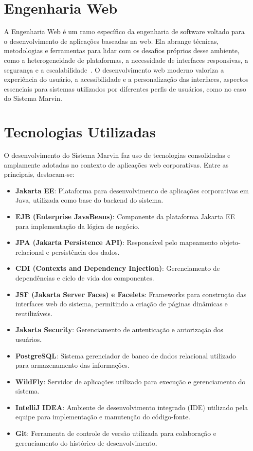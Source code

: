 \section{Engenharia Web}
\label{sec-fundteo-engweb}

A Engenharia Web é um ramo específico da engenharia de software voltado para o desenvolvimento de aplicações baseadas na web. Ela abrange técnicas, metodologias e ferramentas para lidar com os desafios próprios desse ambiente, como a heterogeneidade de plataformas, a necessidade de interfaces responsivas, a segurança e a escalabilidade~\cite{gellersen2002web}. O desenvolvimento web moderno valoriza a experiência do usuário, a acessibilidade e a personalização das interfaces, aspectos essenciais para sistemas utilizados por diferentes perfis de usuários, como no caso do Sistema Marvin.

\section{Tecnologias Utilizadas}
\label{sec-fundteo-tecnologias}

O desenvolvimento do Sistema Marvin faz uso de tecnologias consolidadas e amplamente adotadas no contexto de aplicações web corporativas. Entre as principais, destacam-se:

\begin{itemize}
    \item \textbf{Jakarta EE}: Plataforma para desenvolvimento de aplicações corporativas em Java, utilizada como base do backend do sistema.
    \item \textbf{EJB (Enterprise JavaBeans)}: Componente da plataforma Jakarta EE para implementação da lógica de negócio.
    \item \textbf{JPA (Jakarta Persistence API)}: Responsável pelo mapeamento objeto-relacional e persistência dos dados.
    \item \textbf{CDI (Contexts and Dependency Injection)}: Gerenciamento de dependências e ciclo de vida dos componentes.
    \item \textbf{JSF (Jakarta Server Faces) e Facelets}: Frameworks para construção das interfaces web do sistema, permitindo a criação de páginas dinâmicas e reutilizáveis.
    \item \textbf{Jakarta Security}: Gerenciamento de autenticação e autorização dos usuários.
    \item \textbf{PostgreSQL}: Sistema gerenciador de banco de dados relacional utilizado para armazenamento das informações.
    \item \textbf{WildFly}: Servidor de aplicações utilizado para execução e gerenciamento do sistema.
    \item \textbf{IntelliJ IDEA}: Ambiente de desenvolvimento integrado (IDE) utilizado pela equipe para implementação e manutenção do código-fonte.
    \item \textbf{Git}: Ferramenta de controle de versão utilizada para colaboração e gerenciamento do histórico de desenvolvimento.
\end{itemize}

